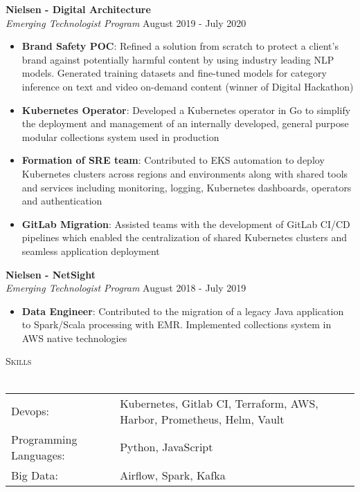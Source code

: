 \documentclass[a4paper]{article}
\newcommand{\lineunder} {
    \vspace*{-8pt} \\
    \hspace*{-18pt} \hrulefill \\
}
\newcommand{\header} [1] {
    {\hspace*{-18pt}\vspace*{6pt} \textsc{#1}}
    \vspace*{-6pt} \lineunder
}
\begin{document}
\textbf{Nielsen - Digital Architecture}\\
\textit{Emerging Technologist Program} \hfill August 2019 - July 2020\\
\vspace{-1mm}
\begin{itemize} \itemsep 1pt
	\item \textbf{Brand Safety POC}: Refined a solution from scratch to protect a client's brand against potentially harmful content by using industry leading NLP models. Generated training datasets and fine-tuned models for category inference on text and video on-demand content (winner of Digital Hackathon)
    \item \textbf{Kubernetes Operator}: Developed a Kubernetes operator in Go to simplify the deployment and management of an internally developed, general purpose modular collections system used in production
    \item \textbf{Formation of SRE team}: Contributed to EKS automation to deploy Kubernetes clusters across regions and environments along with shared tools and services including monitoring, logging, Kubernetes dashboards, operators and authentication
    \item \textbf{GitLab Migration}: Assisted teams with the development of GitLab CI/CD pipelines which enabled the centralization of shared Kubernetes clusters and seamless application deployment
\end{itemize}

\textbf{Nielsen - NetSight}\\
\textit{Emerging Technologist Program} \hfill August 2018 - July 2019\\
\vspace{-1mm}
\begin{itemize} \itemsep 1pt
	\item \textbf{Data Engineer}: Contributed to the migration of a legacy Java application to Spark/Scala processing with EMR. Implemented collections system in AWS native technologies
\end{itemize}

\header{Skills}
\begin{tabular}{ l l }
	Devops:                & Kubernetes, Gitlab CI, Terraform, AWS, Harbor, Prometheus, Helm, Vault \\
	Programming Languages: & Python, JavaScript                                                     \\
	Big Data:              & Airflow, Spark, Kafka                                                  \\
\end{tabular}
\vspace{3mm}
\end{document}
